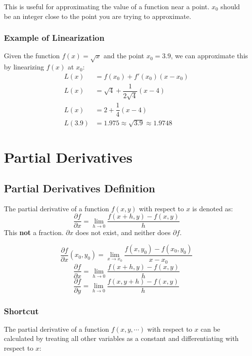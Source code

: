 \documentclass[a4paper,12pt,openany]{book}
\newcommand{\pd}[2]{\dfrac{\partial #1}{\partial #2}}
\begin{document}
This is useful for approximating the value of a function near a point. $x_0$ should be an integer close to the point you are trying to approximate.
\subsubsection{Example of Linearization}
Given the function \(f(x) = \sqrt{x}\) and the point \(x_0 = 3.9\), we can approximate this by linearizing \(f(x)\) at \(x_0\):
\begin{align*}
    L(x) &= f(x_0) + f'(x_0)(x-x_0)\\
    L(x) &= \sqrt{4} + \dfrac{1}{2\sqrt{4}}(x-4)\\
    L(x) &= 2 + \dfrac{1}{4}(x-4)\\
    L(3.9) &= 1.975 \approx \sqrt{3.9} \approx 1.9748    
\end{align*}

\section{Partial Derivatives}
\subsection{Partial Derivatives Definition}

The partial derivative of a function \(f(x, y)\) with respect to \(x\) is denoted as:
\[
    \pd{f}{x} = \lim_{h \to 0} \dfrac{f(x+h, y) - f(x, y)}{h}
\]
This \textbf{not} a fraction. $\partial x$ does not exist, and neither does $\partial f$.

\begin{equation}\label{Partial Derivative at a Point Definition}
    \pd{f}{x}(x_0, y_0) = 
    \lim_{x \to x_0} \dfrac{f(x, y_0) - f(x_0, y_0)}{x-x_0}
\end{equation}
\begin{equation}\label{Partial Derivative delfdelx Definition}
    \pd{f}{x} = \lim_{h \to 0} \dfrac{f(x+h, y) - f(x, y)}{h}
\end{equation}
\begin{equation}\label{Partial Derivative delfdely Definition}
    \pd{f}{y} = \lim_{h \to 0} \dfrac{f(x, y+h) - f(x, y)}{h}
\end{equation}

\subsubsection{Shortcut}
The partial derivative of a function \(f(x, y, \cdots)\) with respect to \(x\) can be calculated by treating all other variables as a constant and differentiating with respect to \(x\):
\end{document}
